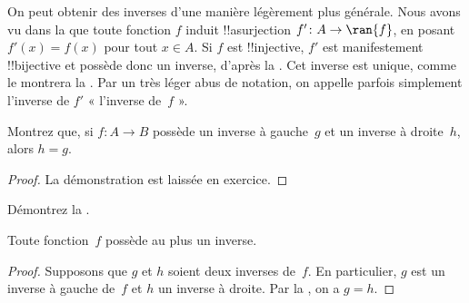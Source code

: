 \documentclass[../../../include/open-logic-section]{subfiles}
\begin{document}
\begin{explain}
On peut obtenir des inverses d’une manière légèrement plus générale.
Nous avons vu dans la  que toute fonction $f$ induit
!!a{surjection} $f'\colon A \to \ran{f}$, en posant $f'(x) = f(x)$
pour tout $x \in A$. Si $f$ est !!{injective}, $f'$ est manifestement
!!{bijective} et possède donc un inverse, d’après la
. Cet inverse est unique, comme le
montrera la .
%
%
Par un très léger abus de notation,
on appelle parfois simplement l’inverse de $f'$ « l’inverse de~$f$ ».
\end{explain}

\begin{prop}%
Montrez que, si $f\colon A \to B$ possède un inverse à gauche~$g$
et un inverse à droite~$h$, alors $h = g$.
\end{prop}

\begin{proof}
La démonstration est laissée en exercice.
\end{proof}

\begin{prob}
Démontrez la .
\end{prob}

\begin{prop}
Toute fonction~$f$ possède au plus un inverse.
\end{prop}

\begin{proof}
Supposons que $g$ et $h$ soient deux inverses de~$f$. En particulier,
$g$ est un inverse à gauche de~$f$ et $h$ un inverse à droite.
Par la , on a $g = h$.
\end{proof}
\end{document}
